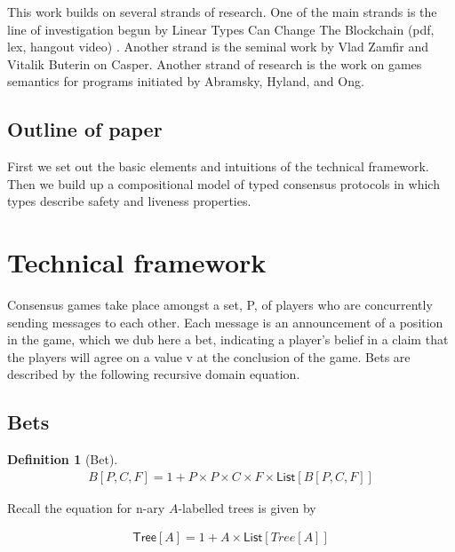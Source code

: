 \documentclass[]{acm_proc_article-sp}
\newtheorem{defn}[thm]{Definition}
\numberwithin{equation}{subsection}
\begin{document}
This work builds on several strands of research. One of the main
strands is the line of investigation begun by Linear Types Can Change
The Blockchain (pdf, lex, hangout video) . Another strand is the
seminal work by Vlad Zamfir and Vitalik Buterin on Casper. Another
strand of research is the work on games semantics for programs
initiated by Abramsky, Hyland, and Ong.

\subsection{Outline of paper}

First we set out the basic elements and intuitions of the technical
framework. Then we build up a compositional model of typed consensus
protocols in which types describe safety and liveness properties.

\section{Technical framework}

Consensus games take place amongst a set, P, of players who are
concurrently sending messages to each other. Each message is an
announcement of a position in the game, which we dub here a bet,
indicating a player's belief in a claim that the players will agree on
a value v at the conclusion of the game. Bets are described by the
following recursive domain equation.

\subsection{Bets}

\begin{defn}[Bet] \label{def.bet}
  \begin{equation*}
    \begin{aligned}
      B[P,C,F] = 1 + P \times P \times C \times F \times \mathsf{List}[B[P,C,F]]
    \end{aligned}
  \end{equation*}
\end{defn}
  
Recall the equation for n-ary $A$-labelled trees is given by

\begin{equation*}
  \begin{aligned}
    \mathsf{Tree}[A] = 1 + A \times \mathsf{List}[Tree[A]]
  \end{aligned}
\end{equation*}
    
\end{document}
